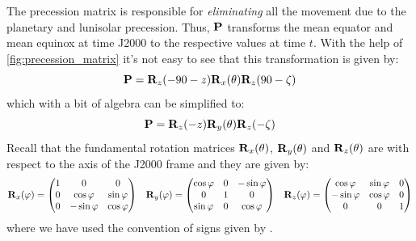\documentclass[../main.tex]{subfiles}
\begin{document}
The precession matrix is responsible for \emph{eliminating} all the movement due to the planetary and lunisolar precession. Thus, $\boldsymbol{\mathrm{P}}$ transforms the mean equator and mean equinox at time J2000 to the respective values at time $t$. With the help of \cref{fig:precession_matrix} it's not easy to see that this transformation is given by:
\begin{equation}
  \boldsymbol{\mathrm{P}}=\boldsymbol{\mathrm{R}}_z(-90-z)\boldsymbol{\mathrm{R}}_x(\theta)\boldsymbol{\mathrm{R}}_z(90-\zeta)
\end{equation}
which with a bit of algebra can be simplified to:
\begin{equation}
  \boldsymbol{\mathrm{P}}=\boldsymbol{\mathrm{R}}_z(-z)\boldsymbol{\mathrm{R}}_y(\theta)\boldsymbol{\mathrm{R}}_z(-\zeta)
\end{equation}
Recall that the fundamental rotation matrices $\boldsymbol{\mathrm{R}}_x(\theta)$, $\boldsymbol{\mathrm{R}}_y(\theta)$ and $\boldsymbol{\mathrm{R}}_z(\theta)$ are with respect to the axis of the J2000 frame and they are given by:
\begin{equation}
  \boldsymbol{\mathrm{R}}_x(\varphi)=\begin{pmatrix}
    1 & 0            & 0           \\
    0 & \cos\varphi  & \sin\varphi \\
    0 & -\sin\varphi & \cos\varphi
  \end{pmatrix}\;\;\;
  \boldsymbol{\mathrm{R}}_y(\varphi)=\begin{pmatrix}
    \cos\varphi & 0 & -\sin\varphi \\
    0           & 1 & 0            \\
    \sin\varphi & 0 & \cos\varphi
  \end{pmatrix}\;\;\;
  \boldsymbol{\mathrm{R}}_z(\varphi)=\begin{pmatrix}
    \cos\varphi  & \sin\varphi & 0 \\
    -\sin\varphi & \cos\varphi & 0 \\
    0            & 0           & 1
  \end{pmatrix}
\end{equation}
where we have used the convention of signs given by \cite{goldstein}.
\end{document}
